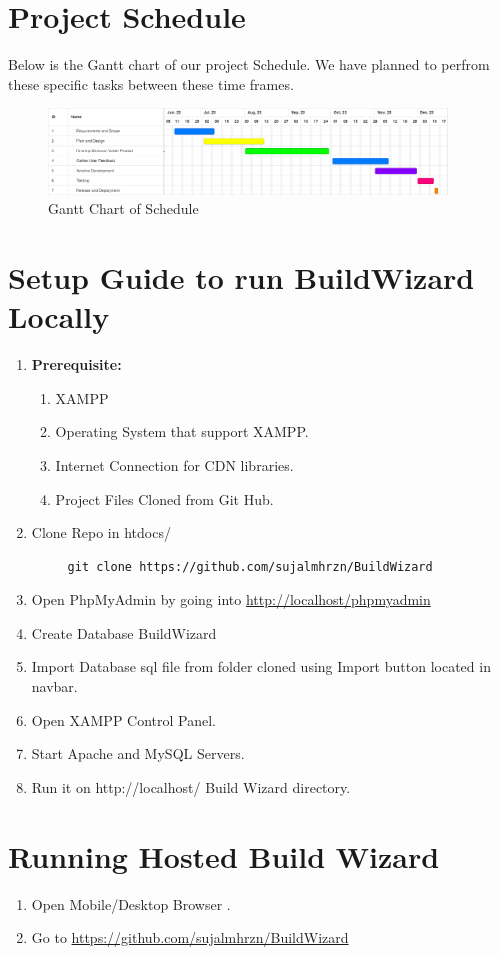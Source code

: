 \section{Project Schedule}
Below is the Gantt chart of our project Schedule. We have planned to perfrom these specific tasks between these time frames.
\begin{figure}[H]
    \centering
        \includegraphics[width=400px]{Diagrams/Gantt_Chart.png}
    \caption{Gantt Chart of Schedule}
\end{figure}

\newpage
\section{Setup Guide to run BuildWizard Locally}
\begin{enumerate}
    \item \textbf{Prerequisite:}
    \begin{enumerate}
        \item XAMPP
        \item Operating System that support XAMPP.
        \item Internet Connection for CDN libraries.
        \item Project Files Cloned from Git Hub.
    \end{enumerate}
    \item Clone Repo in htdocs/\
    \begin{verbatim}
     git clone https://github.com/sujalmhrzn/BuildWizard
    \end{verbatim}
    \item Open PhpMyAdmin by going into \url{http://localhost/phpmyadmin}
    \item Create Database BuildWizard
    \item Import Database sql file from folder cloned using Import button located in navbar.
    \item Open XAMPP Control Panel.
    \item Start Apache and MySQL Servers.
    \item Run it on http://localhost/ Build Wizard directory.
\end{enumerate}
\section{Running Hosted Build Wizard}
\begin{enumerate}
    \item Open Mobile/Desktop Browser .
    \item Go to \url{https://github.com/sujalmhrzn/BuildWizard}
\end{enumerate}
\newpage
